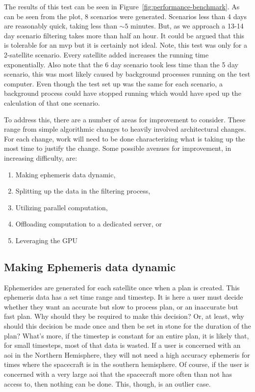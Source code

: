 The results of this test can be seen in Figure~\ref{fig:performance-benchmark}.
As can be seen from the plot, 8 scenarios were generated. Scenarios less than 4
days are reasonably quick, taking less than $\sim5$ minutes. But, as we
approach a 13-14 day scenario filtering takes more than half an hour. It could
be argued that this is tolerable for an \gls{mvp} but it is certainly not
ideal.  Note, this test was only for a 2-satellite scenario. Every satellite
added increases the running time exponentially. Also note that the 6 day
scenario took less time than the 5 day scenario, this was most likely caused by
background processes running on the test computer. Even though the test set up
was the same for each scenario, a background process could have stopped running
which would have sped up the calculation of that one scenario.  

To address this, there are a number of areas for improvement to consider.
These range from simple algorithmic changes to heavily involved architectural
changes. For each change, work will need to be done characterizing what is
taking up the most time to justify the change. Some possible avenues for
improvement, in increasing difficulty, are:

\begin{enumerate}
    \item Making ephemeris data dynamic,
    \item Splitting up the data in the filtering process,
    \item Utilizing parallel computation,
    \item Offloading computation to a dedicated server, or
    \item Leveraging the GPU
\end{enumerate}


\subsection{Making Ephemeris data dynamic}

Ephemerides are generated for each satellite once when a plan is created. This
ephemeris data has a set time range and timestep. It is here a user must decide
whether they want an accurate but slow to process plan, or an inaccurate but
fast plan. Why should they be required to make this decision? Or, at least, why
should this decision be made once and then be set in stone for the duration of
the plan? What's more, if the timestep is constant for an entire plan, it is
likely that, for small timesteps, most of that data is wasted. If a user is
concerned with an \gls{aoi} in the Northern Hemisphere, they will not need a
high accuracy ephemeris for times where the spacecraft is in the southern
hemisphere. Of course, if the user is concerned with a very large \gls{aoi}
that the spacecraft more often than not has access to, then nothing can be
done. This, though, is an outlier case.

